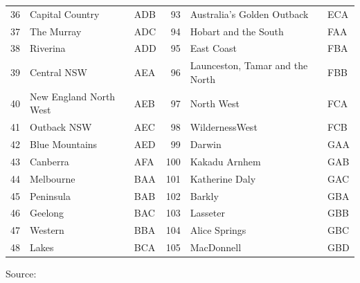 \documentclass[a4paper,11pt]{article}
\theoremstyle{definition}
\begin{document}
\begin{table}[H]
\begin{tabular}{r l l|r l l}
		36                                   & Capital Country         & ADB            & 93                                              & Australia’s Golden Outback      & ECA            \\
		37                                   & The Murray              & ADC            & 94                                              & Hobart and the South            & FAA            \\
		38                                   & Riverina                & ADD            & 95                                              & East Coast                      & FBA            \\
		39                                   & Central NSW             & AEA            & 96                                              & Launceston, Tamar and the North & FBB            \\
		40                                   & New England North West  & AEB            & 97                                              & North West                      & FCA            \\
		41                                   & Outback NSW             & AEC            & 98                                              & WildernessWest                  & FCB            \\
		42                                   & Blue Mountains          & AED            & 99                                              & Darwin                          & GAA            \\
		43                                   & Canberra                & AFA            & 100                                             & Kakadu Arnhem                   & GAB            \\
		44                                   & Melbourne               & BAA            & 101                                             & Katherine Daly                  & GAC            \\
		45                                   & Peninsula               & BAB            & 102                                             & Barkly                          & GBA            \\
		46                                   & Geelong                 & BAC            & 103                                             & Lasseter                        & GBB            \\
		47                                   & Western                 & BBA            & 104                                             & Alice Springs                   & GBC            \\
		48                                   & Lakes                   & BCA            & 105                                             & MacDonnell                      & GBD            \\
		\bottomrule
	\end{tabular}
	\begin{flushleft}
		\begin{footnotesize}
			Source: \cite{wickramasuriya2019, difonzo2022a}
		\end{footnotesize}
	\end{flushleft}
\end{table}
\end{document}
